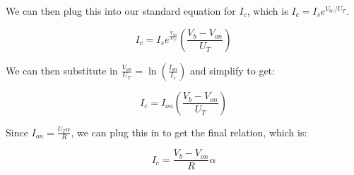 \documentclass{article}
\begin{document}
\begin{itemize}
        We can then plug this into our standard equation for $I_c$, which is $I_c = I_se^{V_{be}/U_T}$.

        \begin{equation*}
            I_c = I_se^{ \frac{ V_{on} }{ U_T } } \left(\frac{V_b - V_{on}}{U_T}\right)
        \end{equation*}

        We can then substitute in $\frac{V_{on}}{U_T} = \ln(\frac{I_{on}}{I_s})$ and simplify to get:

        \begin{equation*}
            I_c = I_{on} \left(\frac{V_b - V_{on}}{U_T}\right)
        \end{equation*}

        Since $I_{on} = \frac{U_T \alpha}{R}$, we can plug this in to get the final relation, which is:

        \begin{equation*}
            I_c = \frac{V_b - V_{on}}{R}\alpha
        \end{equation*}

\end{itemize}
\end{document}
